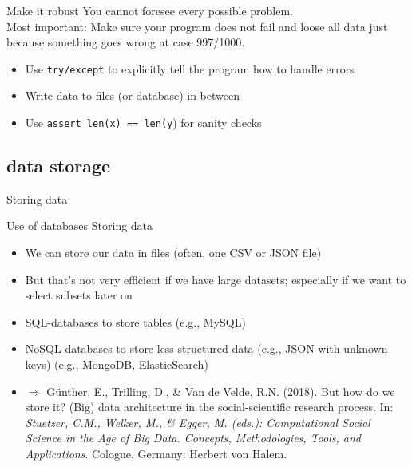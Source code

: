 \documentclass[compress]{beamer}
\begin{document}
\begin{frame}{Make it robust}
You cannot foresee every possible problem.\\
Most important: Make sure your program does not fail and loose all data just because something goes wrong at case 997/1000.
	\begin{itemize}
		\item Use \texttt{try/except} to explicitly tell the program how to handle errors
		\item Write data to files (or database) in between
		\item Use \texttt{assert len(x) == len(y}) for sanity checks
	\end{itemize}	
\end{frame}

\subsection{data storage}
\begin{frame}{Storing data}
\begin{block}{Use of databases}
	Storing data
	\begin{itemize}
		\item We can store our data in files (often, one CSV or JSON file)
		\item But that's not very efficient if we have large datasets; especially if we want to select subsets later on
		\item SQL-databases to store tables (e.g., MySQL)
		\item NoSQL-databases to store less structured data (e.g., JSON with unknown keys) (e.g., MongoDB, ElasticSearch)
		\item $\Rightarrow$ \tiny{Günther, E., Trilling, D., \& Van de Velde, R.N. (2018). But how do we store it? (Big) data architecture in the social-scientific research process. In:\textit{ Stuetzer, C.M., Welker, M., \& Egger, M. (eds.): Computational Social Science in the Age of Big Data. Concepts, Methodologies, Tools, and Applications}. Cologne, Germany: Herbert von Halem.}
	\end{itemize}
\end{block}
\end{frame}
\end{document}
